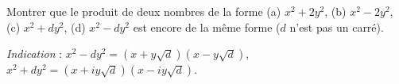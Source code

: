 Montrer que le produit de deux nombres de la forme (a) $x^2 + 2y^2$, (b) $x^2 - 2y^2$, (c) $x^2 + dy^2$, (d) $x^2 - dy^2$ est encore de la même forme ($d$ n'est pas un carré).

\emph{Indication} : $x^2 - dy^2 = (x + y\sqrt{d})(x - y\sqrt{d})$, $x^2 + dy^2 = (x + iy\sqrt{d})(x - iy\sqrt{d})$.

